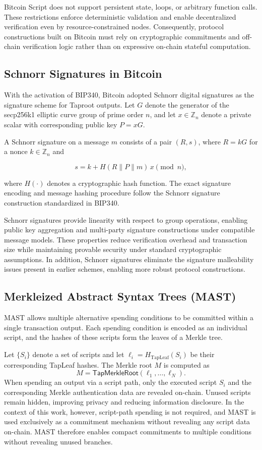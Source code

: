 \documentclass[preprint,12pt]{elsarticle}
\begin{document}
Bitcoin Script does not support persistent state, loops, or arbitrary function calls. These restrictions enforce deterministic validation and enable decentralized verification even by resource-constrained nodes. Consequently, protocol constructions built on Bitcoin must rely on cryptographic commitments and off-chain verification logic rather than on expressive on-chain stateful computation.

\subsection{Schnorr Signatures in Bitcoin}

With the activation of BIP340, Bitcoin adopted Schnorr digital signatures as the signature scheme for Taproot outputs.
Let $G$ denote the generator of the secp256k1 elliptic curve group of prime order $n$, and let $x \in \mathbb{Z}_n$ denote a private scalar with corresponding public key $P = xG$.

A Schnorr signature on a message $m$ consists of a pair $(R, s)$, where $R = kG$ for a nonce $k \in \mathbb{Z}_n$ and

\[
s = k + H(R \parallel P \parallel m)\,x \pmod{n},
\]

where $H(\cdot)$ denotes a cryptographic hash function.
The exact signature encoding and message hashing procedure follow the Schnorr signature construction standardized in BIP340.

Schnorr signatures provide linearity with respect to group operations, enabling public key aggregation and multi-party signature constructions under compatible message models.
These properties reduce verification overhead and transaction size while maintaining provable security under standard cryptographic assumptions.
In addition, Schnorr signatures eliminate the signature malleability issues present in earlier schemes, enabling more robust protocol constructions.

\subsection{Merkleized Abstract Syntax Trees (MAST)}

MAST allows multiple alternative spending conditions to be committed within a single transaction output.
Each spending condition is encoded as an individual script, and the hashes of these scripts form the leaves of a Merkle tree.

Let $\{S_i\}$ denote a set of scripts and let $\ell_i = H_{\text{TapLeaf}}(S_i)$ be their corresponding TapLeaf hashes.
The Merkle root $M$ is computed as
\[
M = \textsf{TapMerkleRoot}(\ell_1, \ldots, \ell_N).
\]
When spending an output via a script path, only the executed script $S_i$ and the corresponding Merkle authentication data are revealed on-chain.
Unused scripts remain hidden, improving privacy and reducing information disclosure. In the context of this work, however, script-path spending is not required, and MAST is used exclusively as a commitment mechanism without revealing any script data on-chain.
MAST therefore enables compact commitments to multiple conditions without revealing unused branches.
\end{document}
